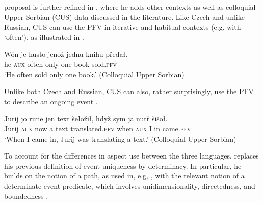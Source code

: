 \documentclass[output=paper,colorlinks,citecolor=brown]{langscibook}
\begin{document}
 proposal is further refined in \citet{mueller23}, where he adds other contexts as well as colloquial Upper Sorbian (CUS) data discussed in the literature. Like Czech and unlike Russian, CUS can use the PFV in iterative and habitual contexts (e.g. with `often'), as illustrated in  \citep[attributed to][]{breu00}.

\ea\label{ex:cushab}
\gll Wón je husto jenož jednu knihu předał.\\
	he \textsc{aux} often only one book sold.\textsc{pfv}\\
\glt 	`He often sold only one book.' \hfill (Colloquial Upper Sorbian)
\z 

\noindent Unlike both Czech and Russian, CUS can also, rather surprisingly, use the PFV to describe an ongoing event  \citep[attributed to][]{breu00}.


\ea\label{ex:cusproc}	
\gll Jurij jo rune jen text šełožił, hdyž sym ja nutř šišoł.\\
Jurij \textsc{aux} now a text translated.\textsc{pfv} when \textsc{aux} I in came.\textsc{pfv}\\
\glt	`When I came in, Jurij was translating a text.' \hfill (Colloquial Upper Sorbian)
\z 

\noindent To account for the differences in aspect use between the three languages, \citet{mueller23} replaces his previous definition of event uniqueness by determinacy. In particular, he builds on the notion of a path, as used in, e.g, \citet{Krifka1998,zwartsprepasp,Gehrke2008}, with the relevant notion of a determinate event predicate, which involves unidimensionality, directedness, and boundedness %
\citep[for the formalisation of these notions see][]{mueller23}.

\end{document}
